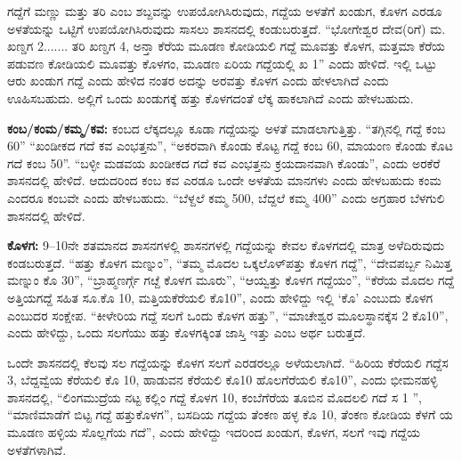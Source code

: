 \vskip 2pt

ಗದ್ದೆಗೆ ಮಣ್ಣು ಮತ್ತು ತರಿ ಎಂಬ ಶಬ್ದವನ್ನು ಉಪಯೋಗಿಸಿರುವುದು, ಗದ್ದೆಯ ಅಳತೆಗೆ ಖಂಡುಗ, ಕೊಳಗ ಎರಡೂ ಅಳತೆಯನ್ನು ಒಟ್ಟಿಗೆ ಉಪಯೋಗಿಸಿರುವುದು ಸಾಸಲು ಶಾಸನದಲ್ಲಿ ಕಂಡುಬರುತ್ತದೆ. “ಭೋಗೇಶ್ವರ ದೇವ(ರಿಗೆ) ಮ. ಖಣ್ಡಗ 2....... ತರಿ ಖಣ್ಡಗ 4, ಅನ್ತಾ ಕೆರೆಯ ಮೂಡಣ ಕೋಡಿಯಲಿ ಗದ್ದೆ ಮೂವತ್ತು ಕೊಳಗ, ಮತ್ತಮಾ ಕೆರೆಯ ಪಡುವಣ ಕೋಡಿಯಲಿ ಮೂವತ್ತು ಕೊಳಗಂ, ಮೂಡಣ ಏರಿಯ ಗದ್ದೆಯಲ್ಲಿ ಖ 1” ಎಂದು ಹೇಳಿದೆ. ಇಲ್ಲಿ ಒಟ್ಟು ಆರು ಖಂಡುಗ ಗದ್ದೆ ಎಂದು ಹೇಳಿದ ನಂತರ ಅದನ್ನು ಅರವತ್ತು ಕೊಳಗ ಎಂದು ಹೇಳಲಾಗಿದೆ ಎಂದು ಊಹಿಸಬಹುದು. ಅಲ್ಲಿಗೆ ಒಂದು ಖಂಡುಗಕ್ಕೆ ಹತ್ತು ಕೊಳಗದಂತೆ ಲೆಕ್ಕ ಹಾಕಲಾಗಿದೆ ಎಂದು ಹೇಳಬಹುದು.

\vskip 2pt

\textbf{ಕಂಬ/ಕಂಮ/ಕಮ್ಮ/ಕವ:} ಕಂಬದ ಲೆಕ್ಕದಲ್ಲೂ ಕೂಡಾ ಗದ್ದೆಯನ್ನು ಅಳತೆ ಮಾಡಲಾಗುತ್ತಿತ್ತು. “ತಗ್ಗಿನಲ್ಲಿ ಗದ್ದೆ ಕಂಬ 60” “ಖಂಡೀಕದ ಗದೆ ಕವ ಎಂಭತ್ತನು”, “ಅಕರವಾಗಿ ಕೊಂಡು ಕೊಟ್ಟ ಗದ್ದೆ ಕಂಬ 60, ಮಾಯಂಣ ಕೊಂಡು ಕೊಟ ಗದೆ ಕಂಬ 50”. “ಬಳ್ಳೀ ಮಡವಯ ಖಂಡೀಕದ ಗದೆ ಕವ ಎಂಭತ್ತನು ಕ್ರಯದಾನವಾಗಿ ಕೊಂಡು”, ಎಂದು ಅರಕೆರೆ ಶಾಸನದಲ್ಲಿ ಹೇಳಿದೆ. ಆದುದರಿಂದ ಕಂಬ ಕವ ಎರಡೂ ಒಂದೇ ಅಳತೆಯ ಮಾನಗಳು ಎಂದು ಹೇಳಬಹುದು ಕಂಮ ಎಂದರೂ ಕಂಬವೇ ಎಂದು ಹೇಳಬಹುದು. “ಬೆಳ್ದಲೆ ಕಮ್ಮ 500, ಬೆದ್ದಲೆ ಕಮ್ಮ 400” ಎಂದು ಅಗ್ರಹಾರ ಬೆಳಗುಲಿ ಶಾಸನದಲ್ಲಿ ಹೇಳಿದೆ.

\textbf{ಕೊಳಗ:} 9–10ನೇ ಶತಮಾನದ ಶಾಸನಗಳಲ್ಲಿ ಶಾಸನಗಳಲ್ಲಿ ಗದ್ದೆಯನ್ನು ಕೇವಲ ಕೊಳಗದಲ್ಲಿ ಮಾತ್ರ ಅಳೆದಿರುವುದು ಕಂಡಬರುತ್ತದೆ. “ಹತ್ತು ಕೊಳಗ ಮಣ್ನುಂ”, “ತಮ್ಮ ಮೊದಲ ಒಕ್ಕಲೊಳ್​ ಪತ್ತು ಕೊಳಗ ಗದ್ದೆ”, “ದೇವಪರ್ಬ್ಬ ನಿಮಿತ್ತ ಮಣ್ನುಂ ಕೊ 30”, “ಬ್ರಾಹ್ಮಣರ್ಗ್ಗೆ ಗೞ್ದೆ ಕೊಳಗ ಮೂರು”, “ಆಯ್ವತ್ತು ಕೊಳಗ ಗದ್ದೆಯಂ”, “ಕೆರೆಯ ಮೊದಲ ಗದ್ದೆ ಅತ್ತಿಯಗದ್ದೆ ಸಹಿತ ಸೂ.ಕೊ 10, ಮತ್ತಿಯಕೆರೆಯಲಿ ಕೊ10”, ಎಂದು ಹೇಳಿದ್ದು ಇಲ್ಲಿ ‘ಕೊ’ ಎಂಬುದು ಕೊಳಗ ಎಂಬುದರ ಸಂಕ್ಷೇಪ. “ಕೀಳೇರಿಯ ಗದ್ದೆ ಸಲಗೆ ಒಂದು ಕೊಳಗ ಹತ್ತು”, “ಮಾಚೇಶ್ವರ ಮೂಲಸ್ಥಾನಕ್ಕೆ\break ಸ 2 ಕೊ10”, ಎಂದು ಹೇಳಿದ್ದು, ಒಂದು ಸಲಗೆಯು ಹತ್ತು ಕೊಳಗಕ್ಕಿಂತ ಜಾಸ್ತಿ ಇತ್ತು ಎಂಬ ಅರ್ಥ ಬರುತ್ತದೆ.

ಒಂದೇ ಶಾಸನದಲ್ಲಿ ಕೆಲವು ಸಲ ಗದ್ದೆಯನ್ನು ಕೊಳಗ ಸಲಗೆ ಎರಡರಲ್ಲೂ ಅಳೆಯಲಾಗಿದೆ. “ಹಿರಿಯ ಕೆರೆಯಲಿ ಗದ್ದೆ\break ಸ 3, ಬೆದ್ದವ್ವೆಯ ಕೆರೆಯಲಿ ಕೊ 10, ಹಾಡುವನ ಕೆರೆಯಲಿ ಕೊ10 ಹೊಲಗೆರೆಯಲಿ ಕೊ10”, ಎಂದು ಭೀಮನಹಳ್ಳಿ ಶಾಸನದಲ್ಲಿ, “ಲಿಂಗಮುದ್ರೆಯ ನಟ್ಟ ಕಲ್ಲಿಂ ಗದ್ದೆ ಕೊಳಗ 10, ಕಂಬೆಗೆರೆಯ ತೂಬಿನ ಮೊದಲಲಿ ಗದೆ ಸ 1 ”, “ಮಾಣಿಮಾಡೆಗೆ ಬಿಟ್ಟ ಗದ್ದೆ ಹತ್ತುಕೊಳಗ”, ಬಸದಿಯ ಗದ್ದೆಯ ತೆಂಕಣ ಹಳ್ಳ ಕೊ 10, ತೆಂಕಣ ಕೋಡಿಯ ಕೆಳಗೆ ಯ ಮೂಡಣ ಹಳ್ಳಿಯ ಸೊಲ್ಲಗೆಯ ಗದೆ”, ಎಂದು ಹೇಳಿದ್ದು ಇದರಿಂದ ಖಂಡುಗ, ಕೊಳಗ, ಸಲಗೆ ಇವು ಗದ್ದೆಯ ಅಳತೆಗಳಾಗಿವೆ.

